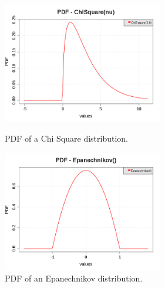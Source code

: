 \begin{figure}[H]
  \begin{minipage}{10cm}
    \begin{center}
      \includegraphics[width=7cm]{pdf_ChiSquare_3.png}
      \caption{PDF of a Chi Square distribution.}
      \label{PDFChiSquare3}
    \end{center}
  \end{minipage}
  \hfill
  \begin{minipage}{10cm}
    \begin{center}
      \includegraphics[width=7cm]{pdf_Epanechnikov.png}
      \caption{PDF of an Epanechnikov distribution.}
      \label{PDFEpanechnikov}
    \end{center}
  \end{minipage}
\end{figure}


